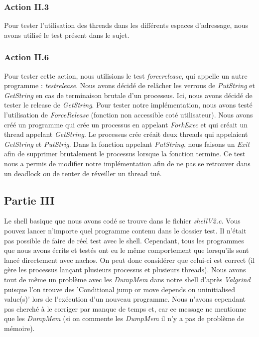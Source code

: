 \documentclass{article}
\begin{document}
\subsubsection{Action II.3}
Pour tester l'utilisation des threads dans les différents espaces d'adressage, nous avons utilisé le test présent dans le sujet.

\subsubsection{Action II.6}
Pour tester cette action, nous utilisions le test \textit{forcerelease}, qui appelle un autre programme : \textit{testrelease}.
Nous avons décidé de relâcher les verrous de \textit{PutString} et \textit{GetString} en cas de terminaison brutale d'un processus.
Ici, nous avons décidé de tester le release de \textit{GetString}.
Pour tester notre implémentation, nous avons testé l'utilisation de \textit{ForceRelease} (fonction non accessible coté utilisateur).
Nous avons créé un programme qui crée un processus en appelant \textit{ForkExec} et qui créait un thread appelant  \textit{GetString}.
Le processus crée créait deux threads qui appelaient  \textit{GetString} et  \textit{PutStrig}. Dans la fonction appelant \textit{PutString},
nous faisons un \textit{Exit} afin de supprimer brutalement le processus lorsque la fonction termine. Ce test nous a permis de modifier notre 
implémentation afin de ne pas se retrouver dans un deadlock ou de tenter de réveiller un thread tué.

\subsection{Partie III}
Le shell basique que nous avons codé se trouve dans le fichier \textit{shellV2.c}. Vous pouvez lancer n'importe quel programme contenu dans le 
dossier test. Il n'était pas possible de faire de réel test avec le shell. Cependant, tous les programmes que nous avons écrits et testés ont eu le
même comportement que lorsqu'ils sont lancé directement avec nachos. On peut donc considérer que celui-ci est correct (il gère les processus lançant
plusieurs processus et plusieurs threads). Nous avons tout de même un problème avec les \textit{DumpMem} dans notre shell d'après \textit{Valgrind} puisque
l'on trouve des 'Conditional jump or move depends on uninitialised value(s)' lors de l'exécution d'un nouveau programme. Nous n'avons cependant pas cherché à le corriger 
par manque de temps et, car ce message ne mentionne que les \textit{DumpMem} (si on commente les \textit{DumpMem} il n'y a pas de problème de mémoire).
\pagebreak
\end{document}
